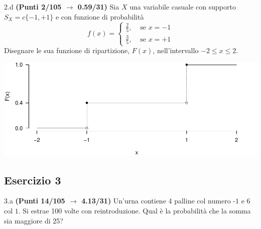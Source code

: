 \documentclass[
  11pt,
]{book}
\theoremstyle{mytheoremstyle}
\theoremstyle{mydefstyle}
\newenvironment{sol}
  {
  \begin{tcolorbox}[enhanced,breakable,arc=0.1mm,boxrule=1pt,colback=white,colframe=iblue,
  title=\bf \fontfamily{lmss}\selectfont \hspace{.5 cm} Soluzione,drop fuzzy shadow]

}{
\end{tcolorbox}
  }
\begin{document}
2.d \textbf{(Punti 2/105 \(\rightarrow\) 0.59/31)} Sia \(X\) una variabile casuale con supporto \(S_X=c\{-1,+1\}\) e con funzione di probabilità
\[
f(x)=\begin{cases}
\frac 25, &\text{ se $x=-1$}\\
\frac 35, &\text{ se $x=+1$}
\end{cases}
\]
Disegnare le sua funzione di ripartizione, \(F(x)\), nell'intervallo \(-2\leq x\leq 2\).

\begin{sol}

\begin{center}\includegraphics{Esami_passati_con_soluzioni_files/figure-latex/2024-108-1} \end{center}

\end{sol}

\subsection{Esercizio 3}\label{esercizio-3-40}

3.a \textbf{(Punti 14/105 \(\rightarrow\) 4.13/31)} Un'urna contiene 4 palline col numero \(\mbox{-1}\) e 6 col \(\mbox{1}\).
Si estrae 100 volte con reintroduzione.
Qual è la probabilità che la somma sia maggiore di 25?
\end{document}

